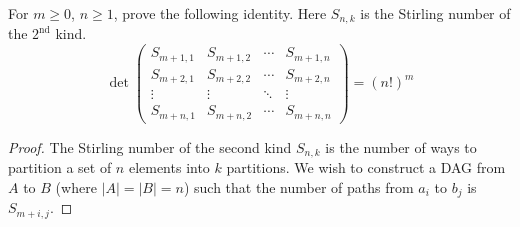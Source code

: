 \documentclass[letterpaper]{article}
\begin{document}
\begin{quest}[\textcolor{red}{Determinant of a matrix of Stirling Numbers}]
    For $m\geq0$, $n\geq 1$, prove the following identity. Here $S_{n,k}$ is the Stirling number of the $2^{\text{nd}}$ kind.
    \[\det\begin{pmatrix}S_{m+1,1}&S_{m+1,2}&\cdots&S_{m+1,n}\\S_{m+2,1}&S_{m+2,2}&\cdots&S_{m+2,n}\\\vdots&\vdots&\ddots&\vdots\\S_{m+n,1}&S_{m+n,2}&\cdots&S_{m+n,n}\end{pmatrix}=(n!)^m\]
\end{quest}
\begin{proof}
    The Stirling number of the second kind $S_{n,k}$ is the number of ways to partition a set of $n$ elements into $k$ partitions. We wish to construct a DAG from $A$ to $B$ (where $|A|=|B|=n$) such that the number of paths from $a_i$ to $b_j$ is $S_{m+i,j}$.
\end{proof}
\end{document}
